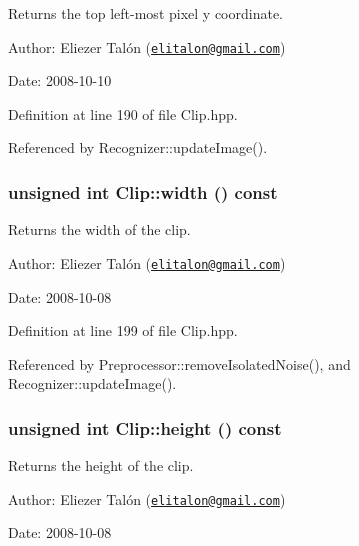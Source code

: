 Returns the top left-most pixel y coordinate. 

\begin{Desc}
\item[Author:]Eliezer Talón (\href{mailto:elitalon@gmail.com}{\tt elitalon@gmail.com}) \end{Desc}
\begin{Desc}
\item[Date:]2008-10-10 \end{Desc}


Definition at line 190 of file Clip.hpp.

Referenced by Recognizer::updateImage().\hypertarget{class_clip_d3e816599913e4051e5d50fae17ecd76}{
\subsubsection[width]{\setlength{\rightskip}{0pt plus 5cm}unsigned int Clip::width () const}}
\label{class_clip_d3e816599913e4051e5d50fae17ecd76}


Returns the width of the clip. 

\begin{Desc}
\item[Author:]Eliezer Talón (\href{mailto:elitalon@gmail.com}{\tt elitalon@gmail.com}) \end{Desc}
\begin{Desc}
\item[Date:]2008-10-08 \end{Desc}


Definition at line 199 of file Clip.hpp.

Referenced by Preprocessor::removeIsolatedNoise(), and Recognizer::updateImage().\hypertarget{class_clip_393710a6b136f400dd5c900f8831e1a8}{
\subsubsection[height]{\setlength{\rightskip}{0pt plus 5cm}unsigned int Clip::height () const}}
\label{class_clip_393710a6b136f400dd5c900f8831e1a8}


Returns the height of the clip. 

\begin{Desc}
\item[Author:]Eliezer Talón (\href{mailto:elitalon@gmail.com}{\tt elitalon@gmail.com}) \end{Desc}
\begin{Desc}
\item[Date:]2008-10-08 \end{Desc}



